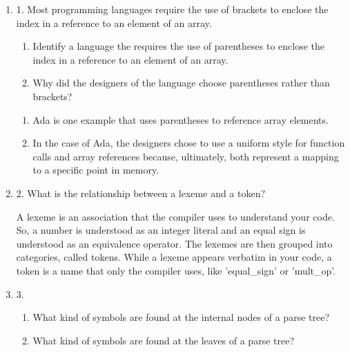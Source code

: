 

\begin{enumerate}
  \item 1. Most programming languages require the use of brackets to
    enclose the index in a reference to an element of an array.
  \begin{enumerate}
    \item Identify a language the requires the use of parentheses
      to enclose the index in a reference to an element of an array.
    \item Why did the designers of the language choose parentheses
      rather than brackets?
    \end{enumerate}

  \begin{answer}

  \begin{enumerate}
    \item Ada is one example that uses parentheses to reference array elements.
    \item In the case of Ada, the designers chose to use a uniform
      style for function calls and array references because,
      ultimately, both represent a mapping to a specific point in
      memory.
    \end{enumerate}

    \end{answer}
    
  \item 2. What is the relationship between a lexeme and a token?

  \begin{answer}

    A lexeme is an association that the compiler uses to understand
    your code. So, a number is understood as an integer literal and an
    equal sign is understood as an equivalence operator. The lexemes
    are then grouped into categories, called tokens. While a lexeme
    appears verbatim in your code, a token is a name that only the
    compiler uses, like 'equal\_sign' or 'mult\_op'.

    \end{answer}

  \item 3.
  \begin{enumerate}
    \item What kind of symbols are found at the internal nodes of a
      parse tree?
    \item What kind of symbols are found at the leaves of a parse tree?
    \end{enumerate}


\end{enumerate}
